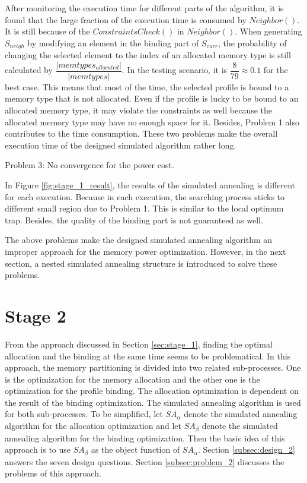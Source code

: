 		After monitoring the execution time for different parts of the algorithm,
		it is found that the large fraction of the execution time is consumed
		by $Neighbor()$. It is still because of the $ConstraintsCheck()$ in $Neighbor()$.
		When generating $S_{neigh}$ by modifying an element in the binding part of
		$S_{curr}$, the probability of changing the selected element to the
		index of an allocated memory type is still calculated by
		$\dfrac{\lvert memtypes_{allocated} \rvert}{\lvert memtypes \rvert}$.
		In the testing scenario, it is $\dfrac{8}{79} \approx 0.1$ for the best case.
		This means that most of the time, the selected profile is bound to a memory
		type that is not allocated. Even if the profile is lucky to be bound to an
		allocated memory type, it may violate the constraints as well because the
		allocated memory type may have no enough space for it.
		Besides, Problem 1 also contributes to the time consumption.
		These two problems make the overall execution time of the designed simulated
		algorithm rather long.
		
		Problem 3: No convergence for the power cost.
		
		In Figure \ref{fig:stage_1_result}, the results of the simulated annealing
		is different for each execution.
		Because in each execution, the searching process sticks to different
		small region due to Problem 1. This is similar to the local optimum trap.
		Besides, the quality of the binding part is not guaranteed as well.
		
		The above problems make the designed simulated annealing algorithm an
		improper approach for the memory power optimization. However, in the next
		section, a nested simulated annealing structure is introduced to solve
		these problems.
		
	\section{Stage 2}
	\label{sec:stage_2}
	From the approach discussed in Section \ref{sec:stage_1}, finding the optimal
	allocation and the binding at the same time seems to be problematical.
	In this approach, the memory partitioning is divided into two related sub-processes.
	One is the optimization for the memory allocation and the other one is the
	optimization for the profile binding.
	The allocation optimization is dependent on the result of the binding optimization.
	The simulated annealing algorithm is used for both sub-processes.
	To be simplified, let $SA_{\alpha}$ denote the simulated annealing algorithm for the
	allocation optimization and let $SA_{\beta}$ denote the simulated annealing algorithm
	for the binding optimization. Then the basic idea of this approach is to use $SA_{\beta}$
	as the object function of $SA_{\alpha}$.
	Section \ref{subsec:design_2} answers the seven design questions.
	Section \ref{subsec:problem_2} discusses the problems of this approach.
	
